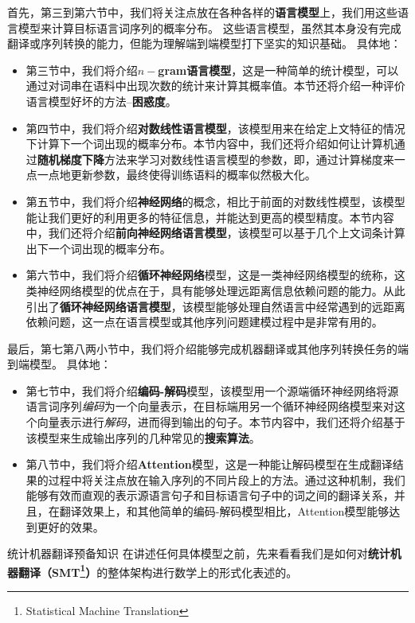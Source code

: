 \documentclass[10pt,a4paper]{ctexart}
\makeatletter
\renewcommand{\section}{\@startsection{section}{1}{0mm}
  {-\baselineskip}{0.5\baselineskip}{\bf\leftline}}
\makeatother
\begin{document}
首先，第三到第六节中，我们将关注点放在各种各样的\textbf{语言模型}上，我们用这些语言模型来计算目标语言词序列的概率分布。
这些语言模型，虽然其本身没有完成翻译或序列转换的能力，但能为理解端到端模型打下坚实的知识基础。
具体地：
\begin{itemize}
\item 第三节中，我们将介绍$n-$\textbf{gram语言模型}，这是一种简单的统计模型，可以通过对词串在语料中出现次数的统计来计算其概率值。本节还将介绍一种评价语言模型好坏的方法--\textbf{困惑度}。
\item 第四节中，我们将介绍\textbf{对数线性语言模型}，该模型用来在给定上文特征的情况下计算下一个词出现的概率分布。本节内容中，我们还将介绍如何让计算机通过\textbf{随机梯度下降}方法来学习对数线性语言模型的参数，即，通过计算梯度来一点一点地更新参数，最终使得训练语料的概率似然极大化。
\item 第五节中，我们将介绍\textbf{神经网络}的概念，相比于前面的对数线性模型，该模型能让我们更好的利用更多的特征信息，并能达到更高的模型精度。本节内容中，我们还将介绍\textbf{前向神经网络语言模型}，该模型可以基于几个上文词条计算出下一个词出现的概率分布。
\item 第六节中，我们将介绍\textbf{循环神经网络}模型，这是一类神经网络模型的统称，这类神经网络模型的优点在于，具有能够处理远距离信息依赖问题的能力。从此引出了\textbf{循环神经网络语言模型}，该模型能够处理自然语言中经常遇到的远距离依赖问题，这一点在语言模型或其他序列问题建模过程中是非常有用的。
\end{itemize}

最后，第七第八两小节中，我们将介绍能够完成机器翻译或其他序列转换任务的端到端模型。
具体地：
\begin{itemize}
\item 第七节中，我们将介绍\textbf{编码-解码}模型，该模型用一个源端循环神经网络将源语言词序列\textit{编码}为一个向量表示，在目标端用另一个循环神经网络模型来对这个向量表示进行\textit{解码}，进而得到输出的句子。本节内容中，我们还将介绍基于该模型来生成输出序列的几种常见的\textbf{搜索算法}。
\item 第八节中，我们将介绍\textbf{Attention}模型，这是一种能让解码模型在生成翻译结果的过程中将关注点放在输入序列的不同片段上的方法。通过这种机制，我们能够有效而直观的表示源语言句子和目标语言句子中的词之间的翻译关系，并且，在翻译效果上，和其他简单的编码-解码模型相比，Attention模型能够达到更好的效果。
\end{itemize}

\newpage

\section{统计机器翻译预备知识}
在讲述任何具体模型之前，先来看看我们是如何对\textbf{统计机器翻译（SMT\footnote{Statistical Machine Translation}）}\cite{brown1993mathematics}的整体架构进行数学上的形式化表述的。
\end{document}
